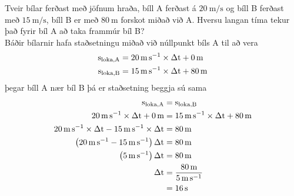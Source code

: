 \begin{formalexample}
Tveir bílar ferðast með jöfnum hraða, bíll A ferðast á $\SI{20}{\m\per\s}$ og 
bíll B ferðast með $\SI{15}{\m\per\s}$, bíll B er með $\SI{80}{\m}$ 
forskot miðað við A.
Hversu langan tíma tekur það fyrir bíl A að taka frammúr bíl B?
\\[4 ex]
Báðir bílarnir hafa staðsetningu miðað við núllpunkt bíls A til að vera
\begin{align*}
	\ulengths_\text{loka,A} &= 
		\SI{20}{\m\per\s} \times \Delta\utime + \SI{0}{\m} \\
	\ulengths_\text{loka,B} &= 
		\SI{15}{\m\per\s} \times \Delta\utime + \SI{80}{\m}
\end{align*}
þegar bíll A nær bíl B þá er staðsetning beggja sú sama
\begin{align*}
	\ulengths_\text{loka,A} &= \ulengths_\text{loka,B}\\
	\SI{20}{\m\per\s} \times \Delta\utime + \SI{0}{\m}
		&= \SI{15}{\m\per\s} \times \Delta\utime + \SI{80}{\m}\\
	\SI{20}{\m\per\s} \times \Delta\utime 
		- \SI{15}{\m\per\s} \times \Delta\utime 
		&=  \SI{80}{\m} \\
	\left( 
		\SI{20}{\m\per\s} - \SI{15}{\m\per\s} \right) \Delta\utime 
			&= \SI{80}{\m} \\
	\left( \SI{5}{\m\per\s} \right) \Delta\utime &=  \SI{80}{\m} \\
	\Delta\utime &=  \frac{ \SI{80}{\m} }{ \SI{5}{\m\per\s} }\\
		&=  \SI{16}{\s}
\end{align*}
\end{formalexample}

